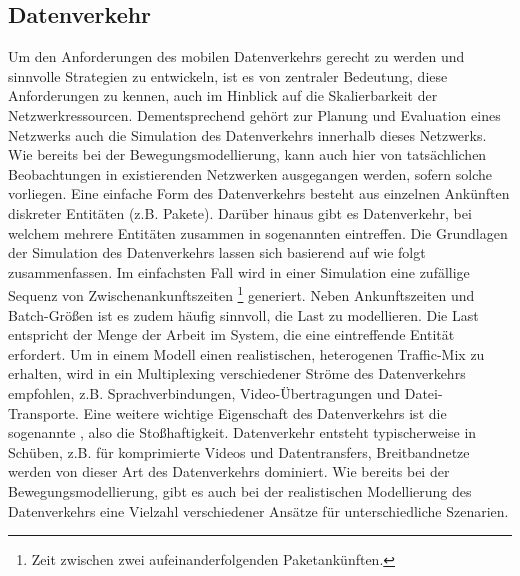 \documentclass[12pt, a4paper]{article}
\begin{document}
\subsection{Datenverkehr}
\label{sec:traffic}

Um den Anforderungen des mobilen Datenverkehrs gerecht zu werden und sinnvolle Strategien zu entwickeln,
ist es von zentraler Bedeutung, diese Anforderungen zu kennen, auch im Hinblick auf die Skalierbarkeit der
Netzwerkressourcen. \cite{Oliveira2014} Dementsprechend gehört zur Planung und Evaluation eines Netzwerks 
auch die Simulation des Datenverkehrs innerhalb dieses Netzwerks. Wie bereits bei der Bewegungsmodellierung, 
kann auch hier von tatsächlichen Beobachtungen in existierenden Netzwerken ausgegangen werden, sofern solche vorliegen.\newline
Eine einfache Form des Datenverkehrs besteht aus einzelnen Ankünften diskreter Entitäten (z.B. Pakete).
Darüber hinaus gibt es Datenverkehr, bei welchem mehrere Entitäten zusammen in sogenannten  
eintreffen. \cite{Frost1994}
Die Grundlagen der Simulation des Datenverkehrs lassen sich basierend auf \cite{Frost1994} wie folgt zusammenfassen.
Im einfachsten Fall wird in einer Simulation eine zufällige Sequenz von Zwischenankunftszeiten \footnote{Zeit zwischen zwei 
aufeinanderfolgenden Paketankünften.} generiert. Neben Ankunftszeiten und Batch-Größen ist es zudem häufig sinnvoll,
die Last zu modellieren. Die Last entspricht der Menge der Arbeit im System, die eine eintreffende Entität
erfordert.
Um in einem Modell einen realistischen, heterogenen Traffic-Mix zu erhalten, wird in \cite{Frost1994} ein Multiplexing
verschiedener Ströme des Datenverkehrs empfohlen, z.B. Sprachverbindungen, Video-Übertragungen und Datei-Transporte.
Eine weitere wichtige Eigenschaft des Datenverkehrs ist die sogenannte , also die Stoßhaftigkeit.
Datenverkehr entsteht typischerweise in Schüben, z.B. für komprimierte Videos und Datentransfers,
Breitbandnetze werden von dieser Art des Datenverkehrs dominiert. \cite{Frost1994}
Wie bereits bei der Bewegungsmodellierung, gibt es auch bei der realistischen Modellierung des Datenverkehrs
eine Vielzahl verschiedener Ansätze für unterschiedliche Szenarien.
\end{document}
